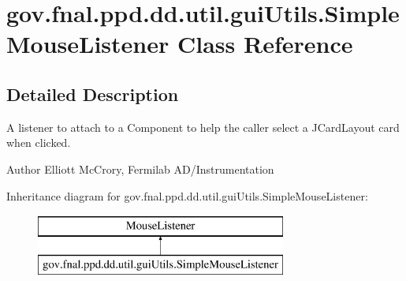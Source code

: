 \hypertarget{classgov_1_1fnal_1_1ppd_1_1dd_1_1util_1_1guiUtils_1_1SimpleMouseListener}{\section{gov.\-fnal.\-ppd.\-dd.\-util.\-gui\-Utils.\-Simple\-Mouse\-Listener Class Reference}
\label{classgov_1_1fnal_1_1ppd_1_1dd_1_1util_1_1guiUtils_1_1SimpleMouseListener}
}


\subsection{Detailed Description}
A listener to attach to a Component to help the caller select a J\-Card\-Layout card when clicked.

\begin{DoxyAuthor}{Author}
Elliott Mc\-Crory, Fermilab A\-D/\-Instrumentation 
\end{DoxyAuthor}
Inheritance diagram for gov.\-fnal.\-ppd.\-dd.\-util.\-gui\-Utils.\-Simple\-Mouse\-Listener\-:\begin{figure}[H]
\begin{center}
\leavevmode
\includegraphics[height=2.000000cm]{classgov_1_1fnal_1_1ppd_1_1dd_1_1util_1_1guiUtils_1_1SimpleMouseListener}
\end{center}
\end{figure}
